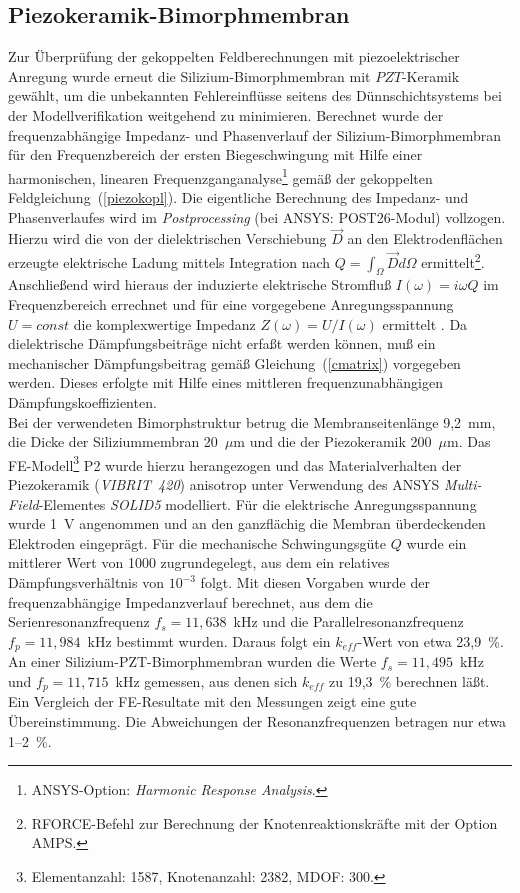 \subsection{Piezokeramik-Bimorphmembran}
\label{pzthybrid}

Zur Überprüfung der gekoppelten Feldberechnungen mit piezoelektrischer
Anregung wurde erneut die Silizium-Bimorphmembran mit $PZT$-Keramik gewählt,
um die unbekannten Fehlereinflüsse seitens des Dünnschichtsystems bei der
Modellverifikation weitgehend zu minimieren.
Berechnet wurde der frequenzabhängige Impedanz- und Phasenverlauf der
Silizium-Bimorphmembran für den Frequenzbereich der ersten Biegeschwingung
mit Hilfe einer harmonischen, linearen
Frequenzganganalyse\footnote{{\sf ANSYS}-Option:
{\em Harmonic Response Analysis}.} gemäß der gekoppelten
Feldgleichung~(\ref{piezokopl}).
Die eigentliche Berechnung des Impedanz- und Phasenverlaufes wird im
{\em Postprocessing} (bei {\sf ANSYS}: {\sf POST26}-Modul) vollzogen.
Hierzu wird die von der dielektrischen Verschiebung $\vec D$ an den
Elektrodenflächen erzeugte elektrische Ladung mittels Integration
nach $Q = \int_{\Omega} \vec D d\Omega$
ermittelt\footnote{{\sf RFORCE}-Befehl zur Berechnung der
Knotenreaktionskräfte mit der
Option {\sf AMPS}.}. Anschließend wird hieraus der induzierte
elektrische Stromfluß $I(\omega) = i \omega Q$ im Frequenzbereich errechnet
und für eine vorgegebene Anregungsspannung $U = const$ die komplexwertige
Impedanz $Z(\omega) = U / I(\omega)$ ermittelt \cite{Ecc92}.
Da dielektrische Dämpfungsbeiträge nicht erfaßt werden
können, muß ein mechanischer Dämpfungsbeitrag gemäß
Gleichung~(\ref{cmatrix}) vorgegeben werden. Dieses erfolgte mit Hilfe
eines mittleren frequenzunabhängigen Dämpfungskoeffizienten.\\
%
Bei der verwendeten
Bimorphstruktur betrug die Membranseitenlänge 9,2~mm, die Dicke der
Siliziummembran 20~$\mu$m und die der Piezokeramik 200~$\mu$m. Das
FE-Modell\footnote{Elementanzahl: 1587, Knotenanzahl:
2382, MDOF: 300.} P2 wurde hierzu herangezogen und das
Materialverhalten der Piezokeramik ({\sl VIBRIT~420}) anisotrop
unter Verwendung des {\sf ANSYS} {\em Multi-Field}-Elementes
{\sl SOLID5} modelliert.
Für die elektrische Anregungsspannung wurde 1~V angenommen und an den
ganzflächig die Membran überdeckenden Elektroden eingeprägt.
Für die mechanische Schwingungsgüte $Q$
wurde ein mittlerer Wert von 1000 zugrundegelegt, aus dem ein
relatives Dämpfungsverhältnis von $10^{-3}$ folgt. Mit diesen Vorgaben
wurde der frequenzabhängige Impedanzverlauf berechnet, aus dem die
Serienresonanzfrequenz $f_{s} = 11,638$~kHz und die Parallelresonanzfrequenz
$f_{p} = 11,984$~kHz bestimmt wurden. Daraus folgt ein $k_{eff}$-Wert von
etwa 23,9~\%. An einer Silizium-PZT-Bimorphmembran wurden die Werte
$f_{s} = 11,495$~kHz und $f_{p} = 11,715$~kHz gemessen, aus denen sich
$k_{eff}$ zu 19,3~\% berechnen läßt.
Ein Vergleich der FE-Resultate mit den Messungen zeigt eine gute
Übereinstimmung. Die Abweichungen der Resonanzfrequenzen betragen nur
etwa 1--2~\%.



